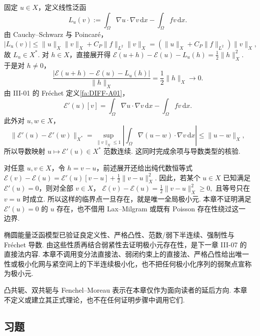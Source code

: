 固定 \(\displaystyle u\in X\)，定义线性泛函
\[
L_u(v)
:=
\int_\Omega\nabla u\cdot\nabla v\,\mathrm{d}x
-
\int_\Omega fv\,\mathrm{d}x.
\]
由 Cauchy--Schwarz 与 Poincaré，
\[
|L_u(v)|
\leqslant
\|u\|_X\|v\|_X
+
C_P\|f\|_{L^2}\|v\|_X
=
(\|u\|_X+C_P\|f\|_{L^2})\|v\|_X,
\]
故 \(\displaystyle L_u\in X^*\). 对 \(\displaystyle h\in X\)，直接展开得
\(\displaystyle \mathcal E(u+h)-\mathcal E(u)-L_u(h) = \frac{1}{2}\|h\|_X^2.\)
于是对 \(\displaystyle h\neq0\)，
\[
\frac{|\mathcal E(u+h)-\mathcal E(u)-L_u(h)|}{\|h\|_X}
=
\frac{1}{2}\|h\|_X
\longrightarrow0.
\]
由 III-01 的 Fréchet 定义\autoref{fa:DIFF-A01}，
\[
\mathcal E'(u)[v]
=
\int_\Omega\nabla u\cdot\nabla v\,\mathrm{d}x
-
\int_\Omega fv\,\mathrm{d}x.
\]
此外对 \(\displaystyle u,w\in X\)，
\[
\|\mathcal E'(u)-\mathcal E'(w)\|_{X^*}
=
\sup_{\|v\|_X\leqslant1}
\left|
\int_\Omega\nabla(u-w)\cdot\nabla v\,\mathrm{d}x
\right|
\leqslant
\|u-w\|_X,
\]
所以导数映射 \(\displaystyle u\mapsto\mathcal E'(u)\in X^*\) 范数连续. 这同时完成余项与导数类型的核验.

对任意 \(\displaystyle u,v\in X\)，令 \(\displaystyle h=v-u\)，前述展开还给出纯代数恒等式
\(\displaystyle \mathcal E(v)-\mathcal E(u) = \mathcal E'(u)[v-u] + \frac{1}{2}\|v-u\|_X^2.\)
因此，若某个 \(\displaystyle u\in X\) 已知满足 \(\displaystyle\mathcal E'(u)=0\)，则对全部 \(\displaystyle v\in X\)，
\(\displaystyle \mathcal E(v)-\mathcal E(u) = \frac{1}{2}\|v-u\|_X^2 \geqslant0,\)
且等号只在 \(\displaystyle v=u\) 时成立. 所以这样的临界点一旦存在，就是唯一全局极小元. 本章不证明满足 \(\displaystyle\mathcal E'(u)=0\) 的 \(\displaystyle u\) 存在，也不借用 Lax--Milgram 或既有 Poisson 存在性绕过这一边界.

\begin{FARemark}
椭圆能量泛函模型已验证良定义性、严格凸性、范数/弱下半连续、强制性与 Fréchet 导数. 由这些性质再结合弱紧性去证明极小元存在性，是下一章 III-07 的直接法内容. 本章不调用变分法直接法、弱闭约束上的直接法、严格凸性给出唯一性或极小化网与紧空间上的下半连续极小化，也不把任何极小化序列的弱聚点宣称为极小元.
\end{FARemark}

\begin{FARemark}
凸共轭、双共轭与 Fenchel--Moreau 表示在本章仅作为面向读者的延后方向. 本章不定义或建立其正式理论，也不在任何证明步骤中调用它们.
\end{FARemark}

\newpage
\subsection{习题}

